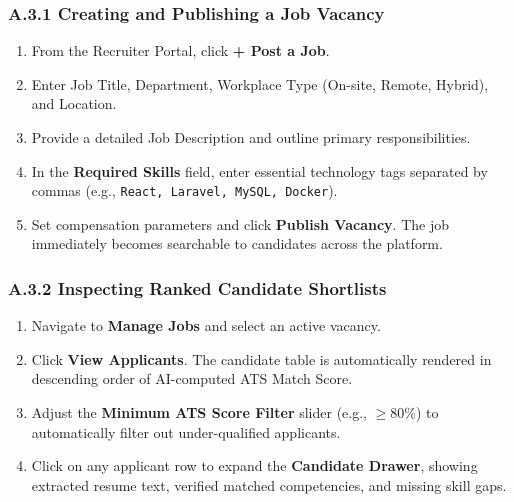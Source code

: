 \subsubsection{A.3.1 Creating and Publishing a Job Vacancy}
\begin{enumerate}
    \item From the Recruiter Portal, click \textbf{+ Post a Job}.
    \item Enter Job Title, Department, Workplace Type (On-site, Remote, Hybrid), and Location.
    \item Provide a detailed Job Description and outline primary responsibilities.
    \item In the \textbf{Required Skills} field, enter essential technology tags separated by commas (e.g., \texttt{React, Laravel, MySQL, Docker}).
    \item Set compensation parameters and click \textbf{Publish Vacancy}. The job immediately becomes searchable to candidates across the platform.
\end{enumerate}

\subsubsection{A.3.2 Inspecting Ranked Candidate Shortlists}
\begin{enumerate}
    \item Navigate to \textbf{Manage Jobs} and select an active vacancy.
    \item Click \textbf{View Applicants}. The candidate table is automatically rendered in descending order of AI-computed ATS Match Score.
    \item Adjust the \textbf{Minimum ATS Score Filter} slider (e.g., $\ge 80\%$) to automatically filter out under-qualified applicants.
    \item Click on any applicant row to expand the \textbf{Candidate Drawer}, showing extracted resume text, verified matched competencies, and missing skill gaps.
\end{enumerate}

